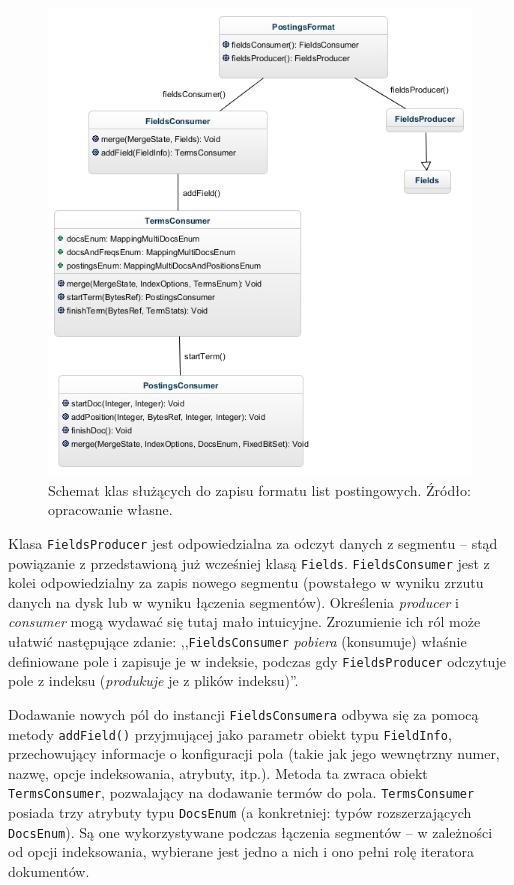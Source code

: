 \begin{figure}[here]
 \includegraphics[scale=0.65]{pictures/PostingsFormat_1.jpg}
 \caption{Schemat klas służących do zapisu formatu list postingowych. Źródło: opracowanie własne.\label{fig:postingFormat}}
\end{figure}

Klasa \texttt{FieldsProducer} jest odpowiedzialna za odczyt danych z segmentu -- stąd powiązanie z przedstawioną już wcześniej klasą \texttt{Fields}. \texttt{FieldsConsumer} jest z kolei odpowiedzialny za zapis nowego segmentu (powstałego w wyniku zrzutu danych na dysk lub w wyniku łączenia segmentów). Określenia \emph{producer} i \emph{consumer} mogą wydawać się tutaj mało intuicyjne. Zrozumienie ich ról może ułatwić następujące zdanie: ,,\texttt{FieldsConsumer} \emph{pobiera} (konsumuje) właśnie definiowane pole i zapisuje je w indeksie, podczas gdy \texttt{FieldsProducer} odczytuje pole z indeksu (\emph{produkuje} je z plików indeksu)''.

Dodawanie nowych pól do instancji \texttt{FieldsConsumera} odbywa się za pomocą metody \texttt{addField()} przyjmującej jako parametr obiekt typu \texttt{FieldInfo}, przechowujący informacje o konfiguracji pola (takie jak jego wewnętrzny numer, nazwę, opcje indeksowania, atrybuty, itp.). Metoda ta zwraca obiekt \texttt{TermsConsumer}, pozwalający na dodawanie termów do pola. \texttt{TermsConsumer} posiada trzy atrybuty typu \texttt{DocsEnum} (a konkretniej: typów rozszerzających \texttt{DocsEnum}). Są one wykorzystywane podczas łączenia segmentów -- w zależności od opcji indeksowania, wybierane jest jedno a nich i ono pełni rolę iteratora dokumentów.

